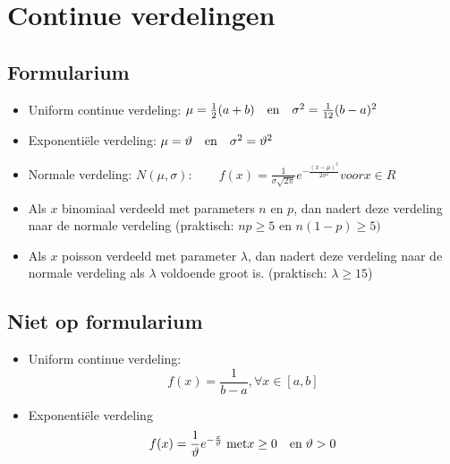 \documentclass[12pt]{report}
\begin{document}
\chapter{Continue verdelingen}
 \section{Formularium}
 \begin{itemize}
  \item Uniform continue verdeling: $\mu = \frac{1}{2}(a + b)\quad\hbox{en}\quad \sigma^2 = \frac{1}{12}(b - a)^2$
  \item Exponentiële verdeling: $\mu = \vartheta\quad\hbox{en}\quad \sigma^2 = \vartheta^2$
  \item Normale verdeling: $N(\mu, \sigma): \qquad f(x) = \frac{1}{\sigma\sqrt{2\pi}}e^{-\frac{(x - \mu)^2}{2\sigma^2}} voor x \in R$
  \item Als $x$ binomiaal verdeeld met parameters $n$ en $p$, dan nadert deze verdeling naar de normale verdeling (praktisch: $np \geq 5$ en $n(1 - p) \geq 5)$
  \item Als $x$ poisson verdeeld met parameter $\lambda$, dan nadert deze verdeling naar de normale verdeling als $\lambda$ voldoende groot is. (praktisch: $\lambda \geq 15$)
 \end{itemize}
 \section{Niet op formularium}
 \begin{itemize}
  \item Uniform continue verdeling:
    $$f(x) = \frac{1}{b - a}, \forall x \in [a, b]$$
  \item Exponentiële verdeling
    $$f(x) = \frac{1}{\vartheta}e^{-\frac{x}{\vartheta}}\;\hbox{met} x \geq 0\quad \hbox{en}\; \vartheta > 0$$

 \end{itemize}
\end{document}
